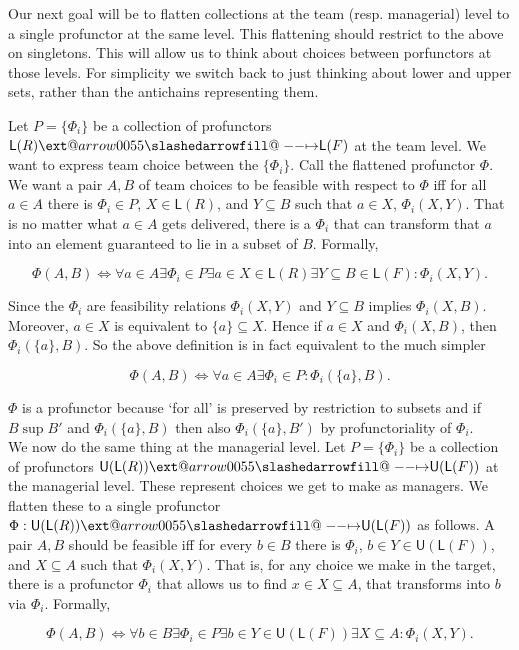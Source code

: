 \documentclass[12pt]{article}
\makeatletter
\theoremstyle{definition}
\theoremstyle{plain}
\theoremstyle{plain}
\theoremstyle{plain}
\theoremstyle{plain}
\theoremstyle{remark}
\theoremstyle{remark}
\newcommand{\sub}{\subseteq}
\newcommand{\low}{\mathsf{L}}
\newcommand{\upper}{\mathsf{U}}
\def\slashedarrowfill@#1#2#3#4#5{%
	$\m@th\thickmuskip0mu\medmuskip\thickmuskip\thinmuskip\thickmuskip
	\relax#5#1\mkern-7mu%
	\cleaders\hbox{$#5\mkern-2mu#2\mkern-2mu$}\hfill
	\mathclap{#3}\mathclap{#2}%
	\cleaders\hbox{$#5\mkern-2mu#2\mkern-2mu$}\hfill
	\mkern-7mu#4$%
}
\def\rightslashedarrowfill@{%
	\slashedarrowfill@\relbar\relbar\mapstochar\rightarrow}
\newcommand\xslashedrightarrow[2][]{%
	\ext@arrow 0055{\rightslashedarrowfill@}{#1}{#2}}
\makeatother
\begin{document}
Our next goal will be to flatten collections at the team (resp. managerial) level to a single profunctor at the same level. This flattening should restrict to the above on singletons. This will allow us to think about choices between porfunctors at those levels. For simplicity we switch back to just thinking about lower and upper sets, rather than the antichains representing them.

Let $P =\{\Phi_i\}$ be a collection of profunctors $\low(R) \xslashedrightarrow{} \low(F)$ at the team level. We want to express team choice between the $\{\Phi_i\}$. Call the flattened profunctor $\Phi$. We want a pair $A,B$ of team choices to be feasible with respect to $\Phi$ iff for all $a \in A$ there is $\Phi_i \in P$, $X \in \low(R)$, and $Y \sub B$ such that $a \in X$, $\Phi_i(X,Y)$. That is no matter what $a \in A$ gets delivered, there is a $\Phi_i$ that can transform that $a$ into an element guaranteed to lie in a subset of $B$. Formally,

$$ \Phi(A,B) \iff \forall a \in A \exists \Phi_i \in P \exists a \in X \in \low(R) \exists Y \sub B \in \low(F) : \Phi_i(X,Y).$$

Since the $\Phi_i$ are feasibility relations $\Phi_i(X,Y)$ and $Y \sub B$ implies $\Phi_i(X,B)$. Moreover, $a \in X$ is equivalent to $\{a\} \sub X$. Hence if $a \in X$ and $\Phi_i(X,B)$, then $\Phi_i(\{a\},B)$. So the above definition is in fact equivalent to the much simpler

$$ \Phi(A,B) \iff \forall a \in A \exists \Phi_i \in P: \Phi_i(\{a\},B).$$

$\Phi$ is a profunctor because `for all' is preserved by restriction to subsets and if $B \sup B'$ and $\Phi_i(\{a\},B)$ then also  $\Phi_i(\{a\},B')$ by profunctoriality of $\Phi_i$. \\

We now do the same thing at the managerial level. Let $P =\{\Phi_i\}$ be a collection of profunctors $\upper(\low(R)) \xslashedrightarrow{} \upper(\low(F))$ at the managerial level. These represent choices we get to make as managers. We flatten these to a single profunctor $\Phi: \upper(\low(R)) \xslashedrightarrow{} \upper(\low(F))$ as follows. A pair $A,B$ should be feasible iff for every $b \in B$ there is $\Phi_i$, $b \in Y \in \upper(\low(F))$, and $X \sub A$ such that $\Phi_i(X,Y)$. That is, for any choice we make in the target, there is a profunctor $\Phi_i$ that allows us to find $x \in X \sub A$, that transforms into $b$ via $\Phi_i$. Formally,

$$ \Phi(A,B) \iff \forall b \in B \exists \Phi_i \in P \exists b \in Y \in \upper(\low(F)) \exists X \sub A : \Phi_i(X,Y).$$
\end{document}
